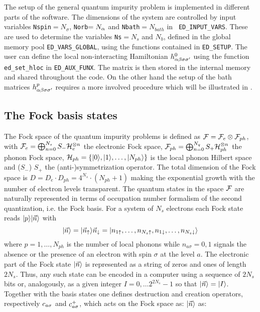 \documentclass[edipack2.tex]{subfiles}
\begin{document}
The setup of the general quantum impurity problem is implemented in
different parts of the \NAME software. The dimensions of the system
are controlled by input variables {\tt Nspin}$=N_\sigma$,
{\tt Norb}$=N_\alpha$ and {\tt Nbath}$=N_{bath}$ in {\tt
  ED\_INPUT\_VARS}. These are used to
determine the variables {\tt Ns}$=N_s$ and $N_b$, defined in the global
memory pool {\tt ED\_VARS\_GLOBAL}, using the functions contained
in {\tt ED\_SETUP}. 
The user can define the local non-interacting Hamiltonian
$h^0_{\alpha\beta\sigma\sigma'}$ using the function {\tt ed\_set\_hloc} in {\tt ED\_AUX\_FUNX}.
The matrix is then stored in the internal memory and shared throughout the
code.
On the other hand the setup of the bath matrices $h^p_{\alpha\beta\sigma\sigma'}$
requires a more involved procedure which will be illustrated in
. 


\subsection{The Fock basis states}\label{sSecBasis}
The Fock space of the quantum impurity problems is defined as
${\cal F}={\cal F}_e\otimes {\cal F}_{ph}$, with ${\cal F}_e=\bigoplus_{n=0}^{N_s}
S_-{\cal H}_e^{\otimes n}$ the electronic Fock space,  ${\cal F}_{ph}=\bigoplus_{n=0}^{N_q}S_+{\cal H}_{ph}^{\otimes n}$ the
phonon Fock space,  ${\cal H}_{ph}=\{|0\rangle,|1\rangle,\dots,|N_{ph}\rangle\}$ is the local phonon Hilbert space
and ($S_-$)  $S_+$ the (anti-)symmetrization operator.  
The total dimension of the Fock space is
$D=D_e\cdot D_{ph}=4^{N_s}\cdot (N_{ph}+1)$ making the exponential
growth with the number of electron levels transparent. 
The quantum states in the space ${\cal F}$ are naturally represented in
terms of occupation number formalism of the second quantization,
i.e. the Fock basis.
For a system of $N_s$ electrons each Fock state
reads $|p\rangle|\vec{n}\rangle$ with
$$
|\vec{n}\rangle=|\vec{n}_\uparrow\rangle{\vec{n}_\downarrow}=|n_{1\uparrow},\dots,n_{N_s\uparrow},n_{1\downarrow},\dots,n_{N_s\downarrow}\rangle
$$ 
where $p=1,\dots,N_{ph}$ is the number of local phonons while $n_{a\sigma}=0,1$ signals the absence or the
presence of an electron with spin $\sigma$ at the level $a$.
The electronic part of the Fock state $|\vec{n}\rangle$ is represented as a string of
zeros and ones of length $2N_s$. Thus, any such state can  be encoded
in a computer using a sequence of $2N_s$ bits or, analogously, as a
given integer $I=0,\dots 2^{2N_s}-1$ so that $|\vec{n}\rangle=|I\rangle$.  
Together with the basis states one defines  destruction and creation 
operators, respectively $c_{a\sigma}$ and $c^+_{a\sigma}$, which acts on the
Fock space as: 
$|\vec{n}\rangle$ as:  
\end{document}
